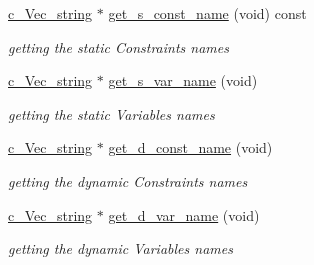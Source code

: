 \begin{Indent}
\begin{DoxyCompactItemize}
\mbox{\hyperlink{group___s_m_s__types_ga4eb8b5e087882b48fc77ba2a18267301}{c\+\_\+\+Vec\+\_\+string}} $\ast$ \mbox{\hyperlink{class_s_m_spp__di__unipi__it_1_1_block_a24cb4ebbb818387a98bb47c10697617e}{get\+\_\+s\+\_\+const\+\_\+name}} (void) const
\begin{DoxyCompactList}\small\item\em getting the static Constraints\textquotesingle{} names \end{DoxyCompactList}\item 
\mbox{\hyperlink{group___s_m_s__types_ga4eb8b5e087882b48fc77ba2a18267301}{c\+\_\+\+Vec\+\_\+string}} $\ast$ \mbox{\hyperlink{class_s_m_spp__di__unipi__it_1_1_block_ab9d6ff0f07fa37614173afbccbc71f31}{get\+\_\+s\+\_\+var\+\_\+name}} (void)
\begin{DoxyCompactList}\small\item\em getting the static Variables\textquotesingle{} names \end{DoxyCompactList}\item 
\mbox{\hyperlink{group___s_m_s__types_ga4eb8b5e087882b48fc77ba2a18267301}{c\+\_\+\+Vec\+\_\+string}} $\ast$ \mbox{\hyperlink{class_s_m_spp__di__unipi__it_1_1_block_a843ab91aeb7ad6839c8f3e5f131c928f}{get\+\_\+d\+\_\+const\+\_\+name}} (void)
\begin{DoxyCompactList}\small\item\em getting the dynamic Constraints\textquotesingle{} names \end{DoxyCompactList}\item 
\mbox{\hyperlink{group___s_m_s__types_ga4eb8b5e087882b48fc77ba2a18267301}{c\+\_\+\+Vec\+\_\+string}} $\ast$ \mbox{\hyperlink{class_s_m_spp__di__unipi__it_1_1_block_af2bfcc91820dd84530bc0677a0a498ee}{get\+\_\+d\+\_\+var\+\_\+name}} (void)
\begin{DoxyCompactList}\small\item\em getting the dynamic Variables\textquotesingle{} names \end{DoxyCompactList}\end{DoxyCompactItemize}
\end{Indent}
